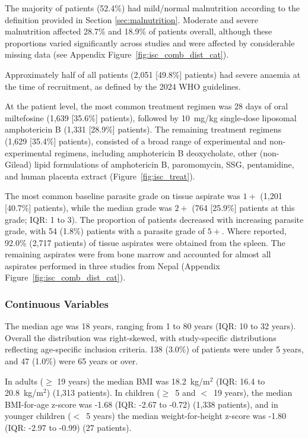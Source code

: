 The majority of patients (52.4\%) had mild/normal malnutrition according to the definition provided in Section \ref{sec:malnutrition}. Moderate and severe malnutrition affected 28.7\% and 18.9\% of patients overall, although these proportions varied significantly across studies and were affected by considerable missing data (see Appendix Figure~\ref{fig:isc_comb_dist_cat}).

Approximately half of all patients (2,051 [49.8\%] patients) had severe anaemia at the time of recruitment, as defined by the 2024 WHO guidelines\cite{who_haem2024}.

At the patient level, the most common treatment regimen was 28 days of oral miltefosine (1,639 [35.6\%] patients), followed by 10~mg/kg single-dose liposomal amphotericin B (1,331 [28.9\%] patients). The remaining treatment regimens (1,629 [35.4\%] patients), consisted of a broad range of experimental and non-experimental regimens, including amphotericin B deoxycholate, other (non-Gilead) lipid formulations of amphotericin B, paromomycin, SSG, pentamidine, and human placenta extract (Figure~\ref{fig:isc_treat}).

The most common baseline parasite grade on tissue aspirate was $1+$ (1,201 [40.7\%] patients), while the median grade was $2+$ (764 [25.9\%] patients at this grade; IQR: 1 to 3). The proportion of patients decreased with increasing parasite grade, with 54 (1.8\%) patients with a parasite grade of $5+$. Where reported, 92.0\% (2,717 patients) of tissue aspirates were obtained from the spleen. The remaining aspirates were from bone marrow and accounted for almost all aspirates performed in three studies from Nepal\cite{rijal2010a,rijal2003,koirala2003} (Appendix Figure~\ref{fig:isc_comb_dist_cat}).



\subsubsection{Continuous Variables}

The median age was 18 years, ranging from 1 to 80 years (IQR: 10 to 32 years). Overall the distribution was right-skewed, with study-specific distributions reflecting age-specific inclusion criteria. 138 (3.0\%) of patients were under 5 years, and 47 (1.0\%) were 65 years or over.

In adults ($\geq$ 19 years) the median BMI was 18.2~kg/m$^2$ (IQR: 16.4 to 20.8~kg/m$^2$) (1,313 patients). In children ($\geq$~5 and $<$~19 years), the median BMI-for-age z-score was -1.68 (IQR: -2.67 to -0.72) (1,338 patients), and in younger children ($<$~5 years) the median weight-for-height z-score was -1.80 (IQR: -2.97 to -0.99) (27 patients).

